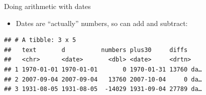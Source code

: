 \documentclass[ignorenonframetext,]{beamer}
\newenvironment{Shaded}{\begin{snugshade}}{\end{snugshade}}
\newcommand{\DataTypeTok}[1]{\textcolor[rgb]{0.13,0.29,0.53}{#1}}
\newcommand{\DecValTok}[1]{\textcolor[rgb]{0.00,0.00,0.81}{#1}}
\newcommand{\KeywordTok}[1]{\textcolor[rgb]{0.13,0.29,0.53}{\textbf{#1}}}
\newcommand{\NormalTok}[1]{#1}
\newcommand{\OperatorTok}[1]{\textcolor[rgb]{0.81,0.36,0.00}{\textbf{#1}}}
\newcommand{\StringTok}[1]{\textcolor[rgb]{0.31,0.60,0.02}{#1}}
\providecommand{\tightlist}{%
  \setlength{\itemsep}{0pt}\setlength{\parskip}{0pt}}
\begin{document}
\begin{frame}[fragile]{Doing arithmetic with dates}
\protect\hypertarget{doing-arithmetic-with-dates}{}

\begin{itemize}
\tightlist
\item
  Dates are ``actually'' numbers, so can add and subtract:
\end{itemize}

\begin{Shaded}
\end{Shaded}

\begin{verbatim}
## # A tibble: 3 x 5
##   text       d          numbers plus30     diffs    
##   <chr>      <date>       <dbl> <date>     <drtn>   
## 1 1970-01-01 1970-01-01       0 1970-01-31 13760 da…
## 2 2007-09-04 2007-09-04   13760 2007-10-04     0 da…
## 3 1931-08-05 1931-08-05  -14029 1931-09-04 27789 da…
\end{verbatim}

\end{frame}
\end{document}
